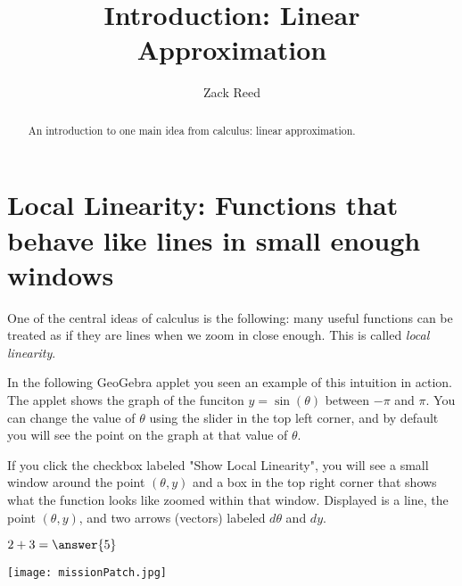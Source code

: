 \documentclass{ximera}
\title{Introduction: Linear Approximation}
\author{Zack Reed}
\begin{document}
\begin{abstract}
    An introduction to one main idea from calculus: linear approximation.
\end{abstract}
\maketitle

\section{Local Linearity: Functions that behave like lines in small enough windows}

One of the central ideas of calculus is the following: many useful functions can be treated as if they are lines when we zoom in close enough. This is called \textit{local linearity}.

In the following GeoGebra applet you seen an example of this intuition in action. The applet shows the graph of the funciton $y=\sin(\theta)$ between $-\pi$ and $\pi$. You can change the value of $\theta$ using the slider in the top left corner, and by default you will see the point on the graph at that value of $\theta$.

If you click the checkbox labeled "Show Local Linearity", you will see a small window around the point $(\theta, y)$ and a box in the top right corner that shows what the function looks like zoomed within that window. Displayed is a line, the point $(\theta, y)$, and two arrows (vectors) labeled $d\theta$ and $dy$. 





\begin{exercise}
    $2+3=\answer{5}$
\end{exercise}

\begin{center} %
\texttt{[image: missionPatch.jpg]}
\end{center}
\end{document}
